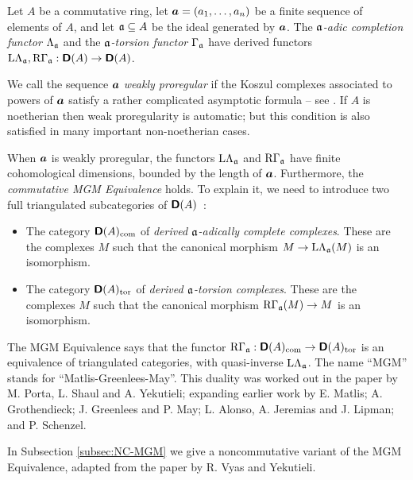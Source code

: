 \begin{exa} \label{exa:4595}  
Let $A$ be a commutative ring, let $\boldsymbol{a} = (a_1, \ldots, a_n)$ be a finite 
sequence of elements of $A$, and let $\mathfrak{a} \subseteq A$ be the ideal generated by 
$\boldsymbol{a}$. The {\em $\mathfrak{a}$-adic completion functor} $\Lambda_{\mathfrak{a}}$ and the 
{\em $\mathfrak{a}$-torsion functor} $\Gamma_{\mathfrak{a}}$ have derived functors 
$\mathrm{L} \Lambda_{\mathfrak{a}}, \mathrm{R} \Gamma_{\mathfrak{a}} : \boldsymbol{\mathsf{D}}(A) \to  \boldsymbol{\mathsf{D}}(A)$.

We call the sequence $\boldsymbol{a}$ {\em weakly proregular} if  
the Koszul complexes associated to powers of $\boldsymbol{a}$ satisfy a rather 
complicated asymptotic formula -- see \cite[Definition 4.21]{PSY}. If $A$ is 
noetherian then weak proregularity is 
automatic; but this condition is also satisfied in many important 
non-noetherian cases. 

When $\boldsymbol{a}$ is weakly proregular, the functors 
$\mathrm{L} \Lambda_{\mathfrak{a}}$ and $\mathrm{R} \Gamma_{\mathfrak{a}}$ have finite cohomological 
dimensions, bounded by the length of $\boldsymbol{a}$.
Furthermore, the {\em commutative MGM Equivalence} holds. To explain it, we 
need to introduce two full triangulated subcategories of $\boldsymbol{\mathsf{D}}(A)$~: 
\begin{itemize}
\item The category $\boldsymbol{\mathsf{D}}(A)_{\mathrm{com}}$ of {\em derived $\mathfrak{a}$-adically 
complete complexes}. These are the complexes $M$ such that the canonical 
morphism $M \to \mathrm{L} \Lambda_{\mathfrak{a}}(M)$ is an isomorphism. 

\item The category $\boldsymbol{\mathsf{D}}(A)_{\mathrm{tor}}$ of {\em derived $\mathfrak{a}$-torsion
complexes}. These are the complexes $M$ such that the canonical morphism
$\mathrm{R} \Gamma_{\mathfrak{a}}(M) \to M$ is an isomorphism. 
\end{itemize}
The MGM Equivalence says that the functor 
$\mathrm{R} \Gamma_{\mathfrak{a}} : \boldsymbol{\mathsf{D}}(A)_{\mathrm{com}} \to  \boldsymbol{\mathsf{D}}(A)_{\mathrm{tor}}$ 
is an equivalence of triangulated categories, with quasi-inverse 
$\mathrm{L} \Lambda_{\mathfrak{a}}$.
The name ``MGM'' stands for ``Matlis-Greenlees-May''.
This duality was worked out in the paper \cite{PSY} by M. Porta, L. Shaul and 
A. Yekutieli; expanding earlier work by E. Matlis; A. Grothendieck; 
J. Greenlees and P. May;  L. Alonso, A. Jeremias and J. Lipman; and P. 
Schenzel. 

In Subsection \ref{subsec:NC-MGM} we give a noncommutative variant of the MGM 
Equivalence, adapted from the paper \cite{VyYe} by R. Vyas and Yekutieli. 
\end{exa}

